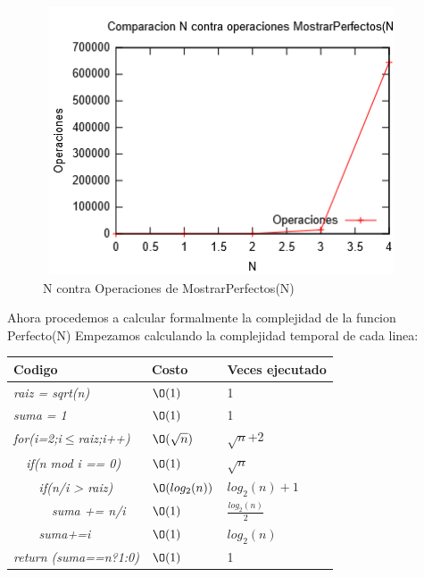\documentclass[spanish]{article}
\begin{document}
	\begin{figure}[H]
		\centering
		\includegraphics[width=400px,height=300px]{grafica4}
		\caption{N contra Operaciones de MostrarPerfectos(N)}
	\end{figure}
	Ahora procedemos a calcular formalmente la complejidad de la funcion Perfecto(N)
	Empezamos calculando la complejidad temporal de cada linea:
	\begin{center}
		\begin{table}[H]
			\begin{tabular}{|l|l|l|}
				\hline
				\rowcolor[HTML]{FFCC67} 
				Codigo                           & Costo & Veces ejecutado \\ \hline
				\textit{raiz = sqrt(n)}                    & $\O(1)$    & 1               \\ \hline
				\textit{suma = 1}                    & $\O(1)$    & 1               \\ \hline
				\textit{for(i=2;i$\leq$raiz;i++)} & $\O(\sqrt{n})$    & $\sqrt{n}$+2             \\ \hline
				\textit{\  \  if(n mod i == 0)}                 & $\O(1)$    & $\sqrt{n}$               \\ \hline
				\textit{\  \  \  \  if(n/i > raiz)}                     & $\O(log_2(n))$    & $log_2(n)+1$              \\ \hline
				\textit{\  \  \  \  \  \  suma += n/i}                     & $\O(1)$    & $\frac{log_2(n)}{2}$               \\ \hline
				\textit{\  \  \  \  suma+=i}                     & $\O(1)$    & $log_2(n)$               \\ \hline
				\textit{return (suma==n?1:0)}                & $\O(1)$    & 1               \\ \hline
			\end{tabular}
		\end{table}										
	\end{center}			
\end{document}
